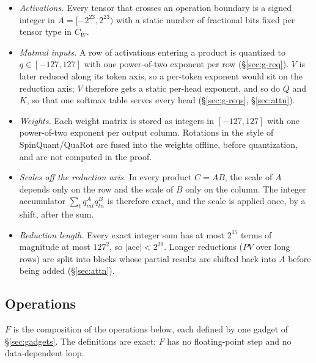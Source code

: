 \documentclass[11pt]{article}
\begin{document}
\begin{itemize}
\item \emph{Activations.} Every tensor that crosses an operation boundary is a signed integer in \(A = [-2^{23}, 2^{23})\) with a static number of fractional bits fixed per tensor type in \(C_W\).
\item \emph{Matmul inputs.} A row of activations entering a product is quantized to \(q \in [-127,127]\) with one power-of-two exponent per row (\S\ref{sec:g-req}).
\(V\) is later reduced along its token axis, so a per-token exponent would sit on the reduction axis; \(V\) therefore gets a static per-head exponent, and so do \(Q\) and \(K\), so that one softmax table serves every head (\S\ref{sec:g-reqs}, \S\ref{sec:attn}).
\item \emph{Weights.} Each weight matrix is stored as integers in \([-127,127]\) with one power-of-two exponent per output column.
Rotations in the style of SpinQuant/QuaRot are fused into the weights offline, before quantization, and are not computed in the proof.
\item \emph{Scales off the reduction axis.} In every product \(C = AB\), the scale of \(A\) depends only on the row and the scale of \(B\) only on the column.
The integer accumulator \(\sum_t q^A_{mt} q^B_{tn}\) is therefore exact, and the scale is applied once, by a shift, after the sum.
\item \emph{Reduction length.} Every exact integer sum has at most \(2^{15}\) terms of magnitude at most \(127^2\), so \(|\mathrm{acc}| < 2^{29}\).
Longer reductions (\(PV\) over long rows) are split into blocks whose partial results are shifted back into \(A\) before being added (\S\ref{sec:attn}).
\end{itemize}

\subsection{Operations}

\(F\) is the composition of the operations below, each defined by one gadget of \S\ref{sec:gadgets}.
The definitions are exact; \(F\) has no floating-point step and no data-dependent loop.
\end{document}
